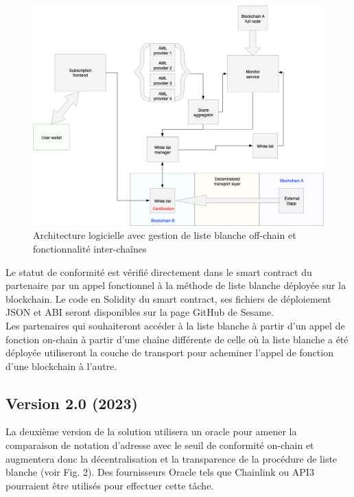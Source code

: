 ﻿\documentclass[a4paper]{article}
\begin{document}
\begin{figure}[!h]
\centering
\includegraphics[scale=0.35]{architecture_v1_crosschain_trim.png}
\caption{Architecture logicielle avec gestion de liste blanche off-chain et fonctionnalité inter-chaînes}
\label{offchain}
\end{figure}  

Le statut de conformité est vérifié directement dans le smart contract du partenaire par un appel fonctionnel à la méthode de liste blanche déployée sur la blockchain. Le code en Solidity du smart contract, ses fichiers de déploiement JSON et ABI seront disponibles sur la page GitHub de Sesame. \\

Les partenaires qui souhaiteront accéder à la liste blanche à partir d'un appel de fonction on-chain à partir d'une chaîne différente de celle où la liste blanche a été déployée utiliseront la couche de transport pour acheminer l'appel de fonction d'une blockchain à l'autre.

\subsection{Version 2.0 (2023)}
La deuxième version de la solution utilisera un oracle pour amener la comparaison de notation d'adresse avec le seuil de conformité on-chain et augmentera donc la décentralisation et la transparence de la procédure de liste blanche (voir Fig. 2). Des fournisseurs Oracle tels que Chainlink ou API3 pourraient être utilisés pour effectuer cette tâche. \\
\end{document}
